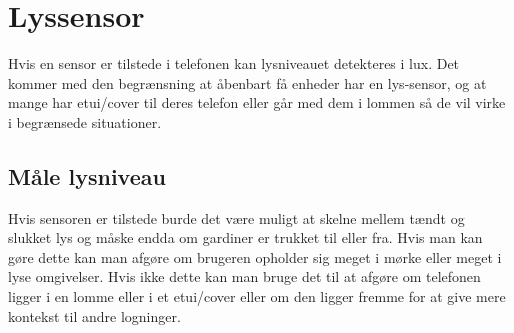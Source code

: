 \section{Lyssensor}
Hvis en sensor er tilstede i telefonen kan lysniveauet detekteres i lux. Det kommer med den begrænsning at åbenbart få enheder har en lys-sensor, og at mange har etui/cover til deres telefon eller går med dem i lommen så de vil virke i begrænsede situationer.

\subsection{Måle lysniveau}
Hvis sensoren er tilstede burde det være muligt at skelne mellem tændt og slukket lys og måske endda om gardiner er trukket til eller fra. 
Hvis man kan gøre dette kan man afgøre om brugeren opholder sig meget i mørke eller meget i lyse omgivelser. 
Hvis ikke dette kan man bruge det til at afgøre om telefonen ligger i en lomme eller i et etui/cover eller om den ligger fremme for at give mere kontekst til andre logninger.

